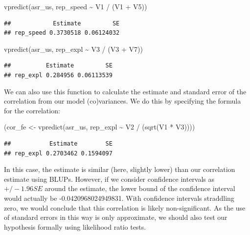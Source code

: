 \documentclass[
  12pt,
]{book}
\newenvironment{Shaded}{\begin{snugshade}}{\end{snugshade}}
\newcommand{\FunctionTok}[1]{\textcolor[rgb]{0.00,0.00,0.00}{#1}}
\newcommand{\NormalTok}[1]{#1}
\newcommand{\OtherTok}[1]{\textcolor[rgb]{0.56,0.35,0.01}{#1}}
\newcommand{\SpecialCharTok}[1]{\textcolor[rgb]{0.00,0.00,0.00}{#1}}
\begin{document}
\begin{Shaded}
\begin{Highlighting}[]
\FunctionTok{vpredict}\NormalTok{(asr\_us, rep\_speed }\SpecialCharTok{\textasciitilde{}}\NormalTok{ V1 }\SpecialCharTok{/}\NormalTok{ (V1 }\SpecialCharTok{+}\NormalTok{ V5))}
\end{Highlighting}
\end{Shaded}

\begin{verbatim}
##            Estimate         SE
## rep_speed 0.3730518 0.06124032
\end{verbatim}

\begin{Shaded}
\begin{Highlighting}[]
\FunctionTok{vpredict}\NormalTok{(asr\_us, rep\_expl }\SpecialCharTok{\textasciitilde{}}\NormalTok{ V3 }\SpecialCharTok{/}\NormalTok{ (V3 }\SpecialCharTok{+}\NormalTok{ V7))}
\end{Highlighting}
\end{Shaded}

\begin{verbatim}
##          Estimate         SE
## rep_expl 0.284956 0.06113539
\end{verbatim}

We can also use this function to calculate the estimate and standard error of the correlation from our model (co)variances. We do this by specifying the formula for the correlation:

\begin{Shaded}
\begin{Highlighting}[]
\NormalTok{(cor\_fe }\OtherTok{\textless{}{-}} \FunctionTok{vpredict}\NormalTok{(asr\_us, rep\_expl }\SpecialCharTok{\textasciitilde{}}\NormalTok{ V2 }\SpecialCharTok{/}\NormalTok{ (}\FunctionTok{sqrt}\NormalTok{(V1 }\SpecialCharTok{*}\NormalTok{ V3))))}
\end{Highlighting}
\end{Shaded}

\begin{verbatim}
##           Estimate        SE
## rep_expl 0.2703462 0.1594097
\end{verbatim}

In this case, the estimate is similar (here, slightly lower) than our correlation estimate using BLUPs.
However, if we consider confidence intervals as \(+/- 1.96SE\) around the estimate, the lower bound of the confidence interval would actually be -0.0420968024949831.
With confidence intervals straddling zero, we would conclude that this correlation is likely non-significant.
As the use of standard errors in this way is only approximate, we should also test our hypothesis formally using likelihood ratio tests.
\end{document}
